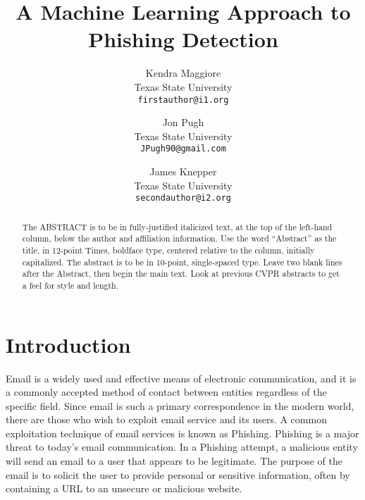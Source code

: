 \documentclass[10pt,twocolumn,letterpaper]{article}
\begin{document}
\title{A Machine Learning Approach to Phishing Detection}

\author{Kendra Maggiore\\
Texas State University\\
{\tt\small firstauthor@i1.org}
\and
Jon Pugh\\
Texas State University\\
{\tt\small JPugh90@gmail.com}
\and
James Knepper\\
Texas State University\\
{\tt\small secondauthor@i2.org}
}

\maketitle

\begin{abstract}
   The ABSTRACT is to be in fully-justified italicized text, at the top
   of the left-hand column, below the author and affiliation
   information. Use the word ``Abstract'' as the title, in 12-point
   Times, boldface type, centered relative to the column, initially
   capitalized. The abstract is to be in 10-point, single-spaced type.
   Leave two blank lines after the Abstract, then begin the main text.
   Look at previous CVPR abstracts to get a feel for style and length.
\end{abstract}

\section{Introduction}

Email is a widely used and effective means of electronic communication, and it is a commonly accepted method of contact between entities regardless of the specific field.  Since email is such a primary correspondence in the modern world, there are those who wish to exploit email service and its users.  A common exploitation technique of email services is known as Phishing.  Phishing is a major threat to today’s email communication.  In a Phishing attempt, a malicious entity will send an email to a user that appears to be legitimate.  The purpose of the email is to solicit the user to provide personal or sensitive information, often by containing a URL to an unsecure or malicious website.
\end{document}
